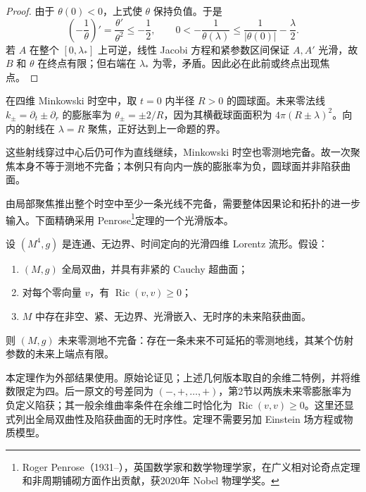 \begin{proof}
	由于 \(\theta(0)<0\)，上式使 \(\theta\) 保持负值。于是
	\[
		\left(-\frac1\theta\right)'
		=\frac{\theta'}{\theta^2}\le-\frac12,
		\qquad
		0<-\frac1{\theta(\lambda)}
		\le\frac1{|\theta(0)|}-\frac\lambda2.
	\]
	若 \(A\) 在整个 \([0,\lambda_*]\) 上可逆，线性 Jacobi 方程和紧参数区间保证 \(A,A'\) 光滑，故 \(B\) 和 \(\theta\) 在终点有限；但右端在 \(\lambda_*\) 为零，矛盾。因此必在此前或终点出现焦点。
\end{proof}

\begin{example}\label{g3:exm:A-minkowski-focal-sphere}
	在四维 Minkowski 时空中，取 \(t=0\) 内半径 \(R>0\) 的圆球面。未来零法线 \(k_\pm=\partial_t\pm\partial_r\) 的膨胀率为 \(\theta_\pm=\pm2/R\)，因为其横截球面面积为 \(4\pi(R\pm\lambda)^2\)。向内的射线在 \(\lambda=R\) 聚焦，正好达到上一命题的界。

	这些射线穿过中心后仍可作为直线继续，Minkowski 时空也零测地完备。故一次聚焦本身不等于测地不完备；本例只有向内一族的膨胀率为负，圆球面并非陷获曲面。
\end{example}

由局部聚焦推出整个时空中至少一条光线不完备，需要整体因果论和拓扑的进一步输入。下面精确采用 Penrose\footnote{Roger Penrose（1931--），英国数学家和数学物理学家，在广义相对论奇点定理和非周期铺砌方面作出贡献，获2020年 Nobel 物理学奖。}定理的一个光滑版本。

\begin{theorem}\label{g3:thm:A-penrose}
	设 \((M^4,g)\) 是连通、无边界、时间定向的光滑四维 Lorentz 流形。假设：
	\begin{enumerate}
		\item \((M,g)\) 全局双曲，并具有非紧的 Cauchy 超曲面；
		\item 对每个零向量 \(v\)，有 \(\operatorname{Ric}(v,v)\ge0\)；
		\item \(M\) 中存在非空、紧、无边界、光滑嵌入、无时序的未来陷获曲面。
	\end{enumerate}
	则 \((M,g)\) 未来零测地不完备：存在一条未来不可延拓的零测地线，其某个仿射参数的未来上端点有限。
\end{theorem}

本定理作为外部结果使用。原始论证见\cite[第58--59页]{Penrose1965Singularities}；上述几何版本取自\cite[第4节，定理1，第6页；第3节，命题1后的注(ii)，第4页]{GallowaySenovilla2010TrappedSubmanifolds}的余维二特例，并将维数限定为四。后一原文的号差同为 \((-,+,\ldots,+)\)，第2节以两族未来零膨胀率为负定义陷获；其一般余维曲率条件在余维二时恰化为 \(\operatorname{Ric}(v,v)\ge0\)。这里还显式列出全局双曲性及陷获曲面的无时序性。定理不需要另加 Einstein 场方程或物质模型。

